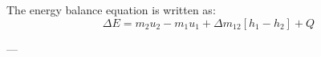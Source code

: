The energy balance equation is written as:  
\[
\Delta E = m_{2} u_{2} - m_{1} u_{1} + \Delta m_{12} \left[ h_{1} - h_{2} \right] + Q
\]  

---